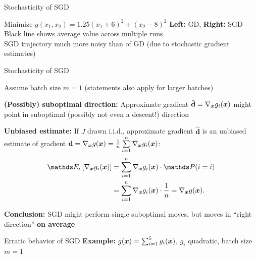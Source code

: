 \documentclass[11pt,compress,t,notes=noshow, xcolor=table]{beamer}
\begin{document}
\begin{framei}{Stochasticity of SGD}
\item[]
\begin{small} \begin{center}
Minimize $g(x_1, x_2) = 1.25(x_1 + 6)^2 + (x_2 - 8)^2$
\textbf{Left:} GD, \textbf{Right:} SGD\\
Black line shows average value across multiple runs \\
SGD trajectory much more noisy than of GD (due to stochastic gradient estimates)
\end{center} \end{small}
\end{framei}

\begin{framei}{Stochasticity of SGD}
\item Assume batch size $m = 1$ (statements also apply for larger batches)
\item \textbf{(Possibly) suboptimal direction:} Approximate gradient $\hat{\mathbf{d}} = \nabla_{\bm{x}} g_i(\bm{x})$ might point in suboptimal (possibly not even a descent!) direction
\item \textbf{Unbiased estimate:} If $J$ drawn i.i.d., approximate gradient $\hat{\mathbf{d}}$ is an unbiased estimate of gradient $\mathbf{d} = \nabla_{\bm{x}} g(\bm{x}) = \frac{1}{n}\sum\limits_{i=1}^n \nabla_{\bm{x}} g_i(\bm{x})$:
\begin{align*}
\E_{i}\left[\nabla_{\xv} g_i(\xv)\right] &= \sumin \nabla_{\xv} g_i(\xv) \cdot \P(i = i) \\
&= \sumin \nabla_{\xv} g_i(\xv) \cdot \frac{1}{n} = \nabla_{\xv} g(\xv).
\end{align*}
\item \textbf{Conclusion:} SGD might perform single suboptimal moves, but moves in \enquote{right direction} \textbf{on average}
\end{framei}

\begin{frame}{Erratic behavior of SGD}
\textbf{Example:} $g(\bm{x}) = \sum_{i = 1}^5 g_i(\bm{x})$, $g_i$ quadratic, batch size $m = 1$\\
\end{frame}
\end{document}
